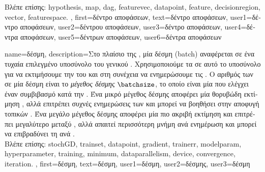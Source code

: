 {{		\foreignlanguage{greek}{Βλέπε επίσης:} \gls{hypothesis}, \gls{map}, \gls{dag}, \gls{featurevec}, \gls{datapoint}, \gls{feature}, \gls{decisionregion},
		\gls{vector}, \gls{featurespace}. },
	first={\foreignlanguage{greek}{δέντρο αποφάσεων}},
	text={\foreignlanguage{greek}{δέντρο αποφάσεων}},
	user1={\foreignlanguage{greek}{δέντρο αποφάσεων}}, %
	user2={\foreignlanguage{greek}{δέντρου αποφάσεων}}, %
	user3={\foreignlanguage{greek}{δέντρο αποφάσεων}}, %
	user4={\foreignlanguage{greek}{δέντρα αποφάσεων}}, %
	user5={\foreignlanguage{greek}{δέντρων αποφάσεων}}, %
	user6={\foreignlanguage{greek}{δέντρα αποφάσεων}} %
}

{name={\foreignlanguage{greek}{δέσμη}},
	description={\foreignlanguage{greek}{Στο πλαίσιο της} 
		, \foreignlanguage{greek}{μία δέσμη} (batch) \foreignlanguage{greek}{αναφέρεται σε ένα τυχαία 
		επιλεγμένο υποσύνολο του γενικού} . \foreignlanguage{greek}{Χρησιμοποιούμε τα}  
		\foreignlanguage{greek}{σε αυτό το υποσύνολο για να εκτιμήσουμε την} 
		 \foreignlanguage{greek}{του}  \foreignlanguage{greek}{και στη συνέχεια 
		να ενημερώσουμε τις} .
		\foreignlanguage{greek}{Ο αριθμός των}  \foreignlanguage{greek}{σε μία δέσμη είναι το} 
		\emph{\foreignlanguage{greek}{μέγεθος δέσμης}} $\batchsize$, \foreignlanguage{greek}{το οποίο είναι μία} 
		 \foreignlanguage{greek}{που ελέγχει έναν συμβιβασμό κατά την} .
		\foreignlanguage{greek}{Ένα μικρό μέγεθος δέσμης αποφέρει μία θορυβώδη εκτίμηση} , \foreignlanguage{greek}{αλλά 
		επιτρέπει συχνές ενημερώσεις των}  \foreignlanguage{greek}{και μπορεί να βοηθήσει στην αποφυγή 
		τοπικών} . \foreignlanguage{greek}{Ένα μεγάλο μέγεθος δέσμης αποφέρει μία 
		πιο ακριβή εκτίμηση}  \foreignlanguage{greek}{και επιτρέπει μεγαλύτερο}  
		\foreignlanguage{greek}{μεταξύ} , \foreignlanguage{greek}{αλλά απαιτεί περισσότερη μνήμη ανά ενημέρωση και 
		μπορεί να επιβραδύνει τη}  \foreignlanguage{greek}{ανά} .
		\\
		\foreignlanguage{greek}{Βλέπε επίσης:} \gls{stochGD}, \gls{trainset}, \gls{datapoint}, \gls{gradient}, \gls{trainerr}, \gls{modelparam}, 
		\gls{hyperparameter}, \gls{training}, \gls{minimum}, \gls{dataparallelism}, \gls{device}, \gls{convergence}, \gls{iteration}. }, 
	first={\foreignlanguage{greek}{δέσμη}},
	text={\foreignlanguage{greek}{δέσμη}},
	user1={\foreignlanguage{greek}{δέσμη}}, %
    	user2={\foreignlanguage{greek}{δέσμης}}, %
	user3={\foreignlanguage{greek}{δέσμη}} %
}

